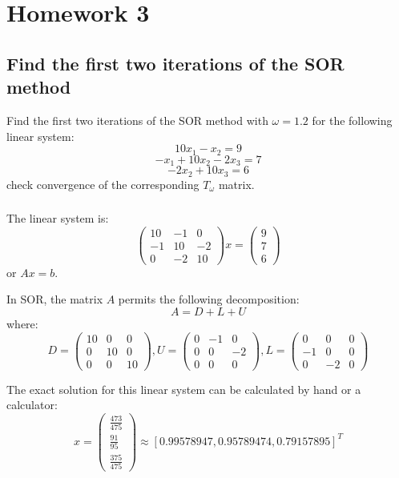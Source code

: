 \documentclass[12pt]{article} %
\newcommand{\1}[1]{\mathds{1}\left[#1\right]}
\begin{document}
\section{Homework 3}
\subsection{Find the first two iterations of the SOR method}
Find the first two iterations of the SOR method with $\omega = 1.2$ for the following linear system:
$$
	10x_1 - x_2 = 9
$$
$$
	-x_1 + 10x_2 - 2x_3 = 7
$$
$$
	-2x_2 + 10x_3 = 6
$$ check convergence of the corresponding $T_{\omega}$ matrix.

\subsubsection{}
The linear system is:
$$
	\begin{pmatrix}
		10 & -1 & 0 \\
		-1 & 10 & -2 \\
		0 & -2  & 10
	\end{pmatrix}x =
	\begin{pmatrix}
		9 \\
		7\\
		6
	\end{pmatrix}
$$ or $Ax= b$.

In SOR, the matrix $A$ permits the following decomposition:
$$
	A = D + L + U
$$ where:
$$
	D = \begin{pmatrix}
		10 & 0 & 0 \\
		0 & 10 & 0 \\
		0 & 0  & 10
	\end{pmatrix}, 
	U = 
	\begin{pmatrix}
		0 & -1 & 0 \\
		0 & 0 & -2 \\
		0 & 0  & 0
	\end{pmatrix}, 
	L = \begin{pmatrix}
		0 & 0 & 0 \\
		-1 & 0 & 0 \\
		0 & -2  & 0
	\end{pmatrix}
$$

The exact solution for this linear system can be calculated by hand or a calculator:
$$
	x = \begin{pmatrix}
		\frac{473}{475} \\
		\frac{91}{95}\\
		\frac{375}{475}
	\end{pmatrix} 
	\approx
	[0.99578947, 0.95789474, 0.79157895]^T
$$
\end{document}
